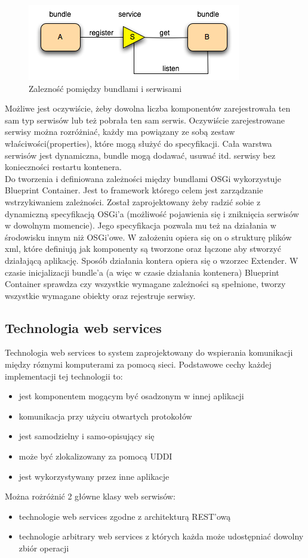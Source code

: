 \begin{figure}[!h]
	\centering
	\includegraphics[scale=0.75]{serveLayer.png} 
	\caption{Zalezność pomiędzy bundlami i serwisami}
\end{figure}
 Możliwe jest oczywiście, żeby dowolna liczba komponentów zarejestrowała ten sam typ serwisów lub też pobrała ten sam serwis. Oczywiście zarejestrowane serwisy można rozróżniać, każdy ma powiązany ze sobą zestaw właściwości(properties), które mogą służyć do specyfikacji. Cała warstwa serwisów jest dynamiczna, bundle mogą dodawać, usuwać itd. serwisy bez konieczności restartu kontenera.  \\
Do tworzenia i definiowana zależności między bundlami OSGi wykorzystuje Blueprint Container. Jest to framework którego celem jest zarządzanie wstrzykiwaniem zależności. Został zaprojektowany żeby radzić sobie z dynamiczną specyfikacją OSGi'a (możliwość pojawienia się i zniknięcia serwisów w dowolnym momencie). Jego specyfikacja pozwala mu też na działania w środowisku innym niż OSGi'owe. W założeniu opiera się on o strukturę plików xml, które definiują jak komponenty są tworzone oraz łączone aby stworzyć działającą aplikację. Sposób działania kontera opiera się o wzorzec Extender. W czasie inicjalizacji bundle'a (a więc w czasie działania kontenera) Blueprint Container sprawdza czy wszystkie wymagane zależności są spełnione, tworzy wszystkie wymagane obiekty oraz rejestruje serwisy. 

\subsection{Technologia web services}
Technologia web services to system zaprojektowany do wspierania komunikacji między róznymi komputerami za pomocą sieci.  Podstawowe cechy każdej implementacji tej technologii to:
\begin{itemize}
	\item jest komponentem mogącym być osadzonym w innej aplikacji
	\item komunikacja przy użyciu otwartych protokołów
	\item jest samodzielny i samo-opisujący się
	\item może być zlokalizowany za pomocą UDDI
	\item jest wykorzystywany przez inne aplikacje
\end{itemize}  
Można rożróżnić 2 główne klasy web serwisów:
\begin{itemize}
	\item technologie web services zgodne z architekturą REST'ową
	\item technologie arbitrary web services z których każda może udostępniać dowolny zbiór operacji
\end{itemize}  
